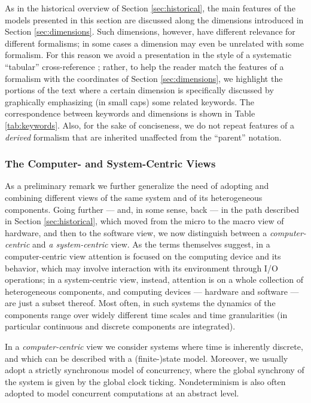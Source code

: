 As in the historical overview of Section \ref{sec:historical}, the
main features of the models presented in this section are discussed
along the dimensions introduced in Section \ref{sec:dimensions}. Such
dimensions, however, have different relevance for different
formalisms; in some cases a dimension may even be unrelated with some
formalism. For this reason we avoid a presentation in the style of a
systematic ``tabular'' cross-reference ; rather,
to help the reader match the features of a formalism with the
coordinates of Section \ref{sec:dimensions}, we highlight the portions
of the text where a certain dimension is specifically discussed by
graphically emphasizing (in small caps) some related
keywords. The correspondence between keywords and dimensions is shown
in Table \ref{tab:keywords}. Also, for the sake of conciseness, we do
not repeat features of a \emph{derived} formalism that are inherited
unaffected from the ``parent'' notation.



\subsubsection*{The Computer- and System-Centric Views}
As a preliminary remark we further generalize the need of adopting 
and combining different views of the same system and of its heterogeneous 
components. Going further --- and, in some sense, back --- in the path 
described in Section \ref{sec:historical}, which moved from the micro to the macro 
view of hardware, and then to the software view, we now distinguish 
between a \emph{computer-centric} and \emph{a system-centric} view. 
As the terms themselves suggest, in a computer-centric view attention 
is focused on the computing device and its behavior, which may 
involve interaction with its environment through I/O operations; 
in a system-centric view, instead, attention is on a whole collection 
of heterogeneous components, and computing devices --- hardware 
and software --- are just a subset thereof. Most often, in such 
systems the dynamics of the components range over widely different 
time scales and time granularities (in particular continuous 
and discrete components are integrated).

In a \emph{computer-centric} view we consider systems where 
time is inherently discrete, and which can be described with 
a (finite-)state model. Moreover, we usually adopt a strictly 
synchronous model of concurrency, where the global synchrony 
of the system is given by the global clock ticking. Nondeterminism 
is also often adopted to model concurrent computations at an 
abstract level.

